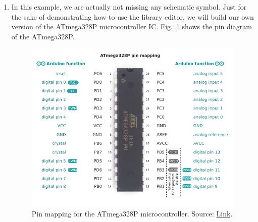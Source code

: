 \documentclass[12pt,letterpaper]{scrartcl}
\begin{document}
\begin{enumerate}
	\item In this example, we are actually not missing any schematic symbol. Just for the sake of demonstrating how to use the library editor, we will build our own version of the ATmega328P microcontroller IC. Fig.~\ref{fig:atmega328p-pins} shows the pin diagram of the ATmega328P.
		\begin{figure}[hp]
			\centering
			\includegraphics[width=5in]{atmega328p-pins}
			\caption{Pin mapping for the ATmega328P microcontroller. Source: \href{https://www.pinterest.com/pin/401101910534454835/}{Link}.}
			\label{fig:atmega328p-pins}
		\end{figure}


\end{enumerate}
\end{document}
